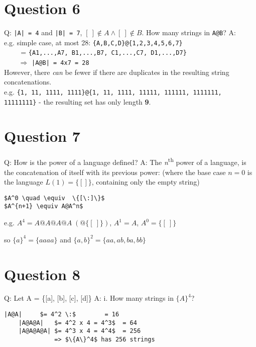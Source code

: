 \documentclass[english]{scrartcl}
\begin{document}
\section*{Question 6}
Q: \verb.|A| = 4. and \verb.|B| = 7., $[\:] \notin A \wedge [\:] \notin B$. How many strings in \verb.A@B.?
\newline
A: \\
e.g. simple case, at most 28: \verb~{A,B,C,D}@{1,2,3,4,5,6,7}~ \\
\verb|    | = \verb~{A1,...,A7, B1,...,B7, C1,...,C7, D1,...,D7}~ \\
\verb|    | $\Rightarrow$ \verb.|A@B| = 4x7 = 28.
\\
However, there \textit{can} be fewer if there are duplicates in the resulting string concatenations. \\
e.g. \verb~{1, 11, 1111, 1111}@{1, 11, 1111, 11111, 111111, 1111111, 11111111}~ - the resulting set has only length \textbf{9}.

\section*{Question 7}
Q: How is the power of a language defined?
\newline
A: The \textit{n}\textsuperscript{th} power of a language, is the concatenation of itself with its previous power:
(where the base case $n=0$ is the language $L(1)=\{[]\}$, containing only the empty string)

\begin{Verbatim}[mathescape,commandchars=\\\{\}]
$A^0 \quad \equiv  \{[\:]\}$
$A^{n+1} \equiv A@A^n$
\end{Verbatim}

e.g. $A^4 = A @ A @ A @ A \; (@ \{[\:]\})$, $A^1 = A$, $A^0 = \{[\:]\}$

\quad so $\{a\}^4 = \{aaaa\}$ and $\{a,b\}^2 = \{aa, ab, ba, bb\}$

\section*{Question 8}
Q: Let A = \{[a], [b], [c], [d]\}
\newline
A: i. How many strings in $\{A\}^4$?

\begin{Verbatim}[mathescape,commandchars=\\\{\}]
    |A@A|     $= 4^2 \:$        = 16
    |A@A@A|   $= 4^2 x 4 = 4^3$  = 64
    |A@A@A@A| $= 4^3 x 4 = 4^4$  = 256
              => $\{A\}^4$ has 256 strings
\end{Verbatim}
\end{document}
